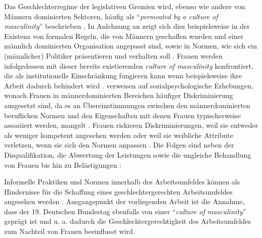 \documentclass[12pt, 
    twoside=false, 
    bibliography=totoc, 
    numbers=endperiod, 
    headings=normal, 
    toc=chapterentrydotfill
    ]{scrbook}
\begin{document}
Das Geschlechterregime der legislativen Gremien wird, ebenso wie andere von Männern dominierten Sektoren, häufig als \enquote{\emph{permeated by a culture of masculinity}} beschrieben \parencites[200]{erikson_2018}{lovenduski_2005}.  
In Anlehnung an \textcite{acker_1990} zeigt sich dies beispielsweise in der Existenz von formalen Regeln, die von Männern geschaffen wurden und einer männlich dominierten Organisation angepasst sind, sowie in Normen, wie sich ein (männlicher) Politiker präsentieren und verhalten soll \parencites[200]{erikson_2018}[48]{acker_1990}. Frauen werden infolgedessen mit dieser bereits existierenden \emph{culture of masculinity} konfrontiert, die als institutionelle Einschränkung fungieren kann wenn beispielsweise ihre Arbeit dadurch behindert wird \parencites[200]{erikson_2018}[47-56]{lovenduski_2005}. \textcite{erikson_2018} verweisen auf sozialpsychologische Erhebungen, wonach Frauen in männerdominierten Bereichen häufiger Diskriminierung ausgesetzt sind, da es an Übereinstimmungen zwischen den männerdominierten beruflichen Normen und den Eigenschaften mit denen Frauen typischerweise assoziiert werden, mangelt \parencites[vgl.][]{burgess_1999}{eagly_2002}{heilman_2001}{heilman_2004}. 
%
Frauen riskieren Diskriminierungen, weil sie entweder als weniger kompetent angesehen werden oder weil sie weibliche Attribute verletzen, wenn sie sich den Normen anpassen \parencite[200]{erikson_2018}. Die Folgen sind neben der Disqualifikation, die Abwertung der Leistungen sowie die ungleiche Behandlung von Frauen bis hin zu Belästigungen \parencites[200]{erikson_2018}{heilman_2001}{burgess_1999}:
%

\citereset
\begin{quote}
      \parencite[200]{erikson_2018}
\end{quote}

Informelle Praktiken und Normen innerhalb des Arbeitsumfeldes können als Hindernisse für die Schaffung eines geschlechtergerechten Arbeitsumfeldes angesehen werden \parencite[200]{erikson_2018}. Ausgangspunkt der vorliegenden Arbeit ist die Annahme, dass der 19. Deutschen Bundestag ebenfalls von einer \enquote{\emph{culture of masculinity}} geprägt ist und u. a. dadurch die Geschlechtergerechtigkeit des Arbeitsumfeldes zum Nachteil von Frauen beeinflusst wird. 
\end{document}

